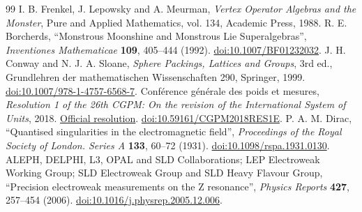 \begin{thebibliography}{99}
 I. B. Frenkel, J. Lepowsky and A. Meurman, \emph{Vertex Operator Algebras and the Monster}, Pure and Applied Mathematics, vol. 134, Academic Press, 1988.
 R. E. Borcherds, “Monstrous Moonshine and Monstrous Lie Superalgebras”, \emph{Inventiones Mathematicae} \textbf{109}, 405--444 (1992). \href{https://doi.org/10.1007/BF01232032}{doi:10.1007/BF01232032}.
 J. H. Conway and N. J. A. Sloane, \emph{Sphere Packings, Lattices and Groups}, 3rd ed., Grundlehren der mathematischen Wissenschaften 290, Springer, 1999. \href{https://doi.org/10.1007/978-1-4757-6568-7}{doi:10.1007/978-1-4757-6568-7}.
 Conférence générale des poids et mesures, \emph{Resolution 1 of the 26th CGPM: On the revision of the International System of Units}, 2018. \href{https://www.bipm.org/en/committees/cg/cgpm/26-2018/resolution-1}{Official resolution}. \href{https://doi.org/10.59161/CGPM2018RES1E}{doi:10.59161/CGPM2018RES1E}.
 P. A. M. Dirac, “Quantised singularities in the electromagnetic field”, \emph{Proceedings of the Royal Society of London. Series A} \textbf{133}, 60--72 (1931). \href{https://doi.org/10.1098/rspa.1931.0130}{doi:10.1098/rspa.1931.0130}.
 ALEPH, DELPHI, L3, OPAL and SLD Collaborations; LEP Electroweak Working Group; SLD Electroweak Group and SLD Heavy Flavour Group, “Precision electroweak measurements on the Z resonance”, \emph{Physics Reports} \textbf{427}, 257--454 (2006). \href{https://doi.org/10.1016/j.physrep.2005.12.006}{doi:10.1016/j.physrep.2005.12.006}.
\end{thebibliography}
